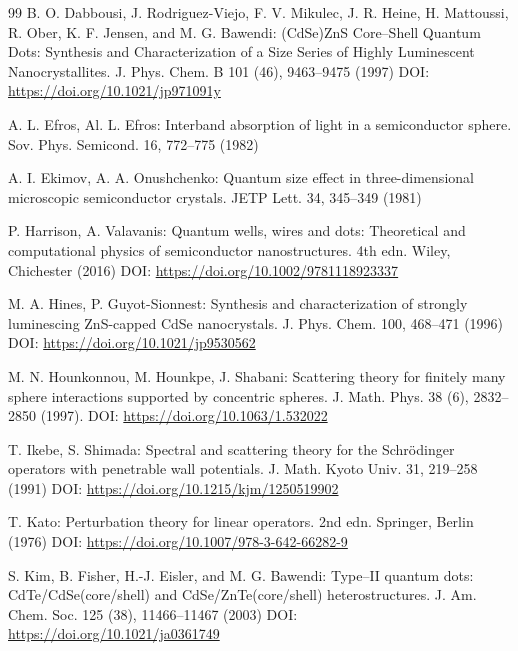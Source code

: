 \documentclass[a4paper,11pt]{article}
\numberwithin{equation}{section}
\theoremstyle{definition}
\theoremstyle{remark}
\begin{document}
\begin{thebibliography}{99}
B. O. Dabbousi, J. Rodriguez-Viejo, F. V. Mikulec, J. R. Heine,
H. Mattoussi, R. Ober, K. F. Jensen, and M. G. Bawendi:
(CdSe)ZnS Core--Shell Quantum Dots: Synthesis and Characterization
of a Size Series of Highly Luminescent Nanocrystallites.
J. Phys. Chem. B 101 (46), 9463--9475 (1997)
\newline DOI: \url{https://doi.org/10.1021/jp971091y}

A. L. Efros, Al. L. Efros:
Interband absorption of light in a semiconductor sphere.
Sov. Phys. Semicond. 16, 772--775 (1982)

A. I. Ekimov, A. A. Onushchenko:
Quantum size effect in three-dimensional microscopic semiconductor crystals.
JETP Lett. 34, 345--349 (1981)

P. Harrison, A. Valavanis:
Quantum wells, wires and dots: Theoretical and computational physics
of semiconductor nanostructures. 4th edn.
Wiley, Chichester (2016)
\newline DOI: \url{https://doi.org/10.1002/9781118923337}

M. A. Hines, P. Guyot-Sionnest:
Synthesis and characterization of strongly luminescing
ZnS-capped CdSe nanocrystals.
J. Phys. Chem. 100, 468--471 (1996)
\newline DOI: \url{https://doi.org/10.1021/jp9530562}

M. N. Hounkonnou, M. Hounkpe, J. Shabani:
Scattering theory for finitely many sphere interactions supported by concentric spheres.
J. Math. Phys. 38 (6), 2832--2850 (1997).
\newline DOI: \url{https://doi.org/10.1063/1.532022}

T. Ikebe, S. Shimada:
Spectral and scattering theory for the Schr\"odinger operators
with penetrable wall potentials.
J. Math. Kyoto Univ. 31, 219--258 (1991)
\newline DOI: \url{https://doi.org/10.1215/kjm/1250519902}

T. Kato:
Perturbation theory for linear operators. 2nd edn.
Springer, Berlin (1976)
\newline DOI: \url{https://doi.org/10.1007/978-3-642-66282-9}

S. Kim, B. Fisher, H.-J. Eisler, and M. G. Bawendi:
Type--II quantum dots: CdTe/CdSe(core/shell) and
CdSe/ZnTe(core/shell) heterostructures.
J. Am. Chem. Soc. 125 (38), 11466--11467 (2003)
\newline DOI: \url{https://doi.org/10.1021/ja0361749}


\end{thebibliography}
\end{document}
